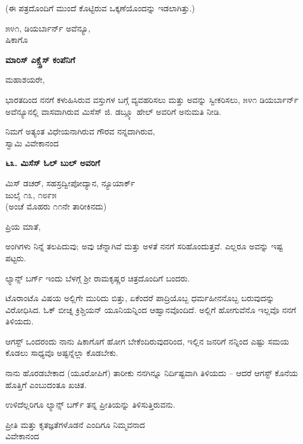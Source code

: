(ಈ ಪತ್ರದೊಂದಿಗೆ ಮುಂದೆ ಕೊಟ್ಟಿರುವ ಒಕ್ಕಣೆಯೊಂದನ್ನು ಇಡಲಾಗಿತ್ತು.)

\begin{flushright}
೫೪೧, ಡಿಯರ್ಬಾರ್ನ್ ಅವೆನ್ಯೂ,\\ಷಿಕಾಗೊ
\end{flushright}

\begin{center}
\textbf{ಮಾರಿಸ್ ಎಕ್ಸ್ಪ್ರೆಸ್ ಕಂಪೆನಿಗೆ}
\end{center}

ಮಹಾಶಯರೇ,

ಭಾರತದಿಂದ ನನಗೆ ಕಳುಹಿಸಿರುವ ವಸ್ತುಗಳ ಬಗ್ಗೆ ವ್ಯವಹರಿಸಲು ಮತ್ತು ಅವನ್ನು ಸ್ವೀಕರಿಸಲು, ೫೪೧ ಡಿಯರ್ಬಾರ್ನ್ ಅವೆನ್ಯೂನಲ್ಲಿ ವಾಸವಾಗಿರುವ ಮಿಸೆಸ್ ಜಿ. ಡಬ್ಲ್ಯೂ ಹೇಲ್ ಅವರಿಗೆ ಅನುಮತಿ ನೀಡಿ.

\begin{flushright}
ನಿಮಗೆ ಅತ್ಯಂತ ವಿಧೇಯನಾಗಿರುವ ಗೌರವ ನನ್ನದಾಗಿರುವ,\\ಸ್ವಾಮಿ ವಿವೇಕಾನಂದ
\end{flushright}

\begin{center}
\textbf{೬೩. ಮಿಸೆಸ್ ಓಲ್ ಬುಲ್ ಅವರಿಗೆ}
\end{center}

\begin{flushright}
 ಮಿಸ್ ಡಚರ್, ಸಹಸ್ರದ್ವೀಪೋದ್ಯಾನ, ನ್ಯೂಯಾರ್ಕ್\\ಜುಲೈ ೧೩, ೧೮೯೫\\(ಅಂಚೆ ಮೊಹರು ೧೧ನೇ ತಾರೀಕಿನದು)
\end{flushright}

ಪ್ರಿಯ ಮಾತೆ,

ಅಂಗಿಗಳು ನಿನ್ನೆ ತಲಪಿದುವು; ಅವು ಚೆನ್ನಾಗಿವೆ ಮತ್ತು ಅಳತೆ ನನಗೆ ಸರಿಹೊಂದುತ್ತವೆ. ಎಲ್ಲರೂ ಅವನ್ನು ಇಷ್ಟ ಪಟ್ಟರು.

ಲ್ಯಾನ್ಸ್ ಬರ್ಗ್ ಇಂದು ಬೆಳಗ್ಗೆ ಶ‍್ರೀ ರಾಮಕೃಷ್ಣರ ಚಿತ್ರದೊಂದಿಗೆ ಬಂದರು.

ಟೊರಾಂಟೊ ವಿಷಯ ಅಲ್ಲಿಗೇ ಮುರಿದು ಬಿತ್ತು, ಏಕೆಂದರೆ ಪಾದ್ರಿಯೊಬ್ಬ ಧರ್ಮಹೀನನೊಬ್ಬ ಬರುವುದನ್ನು ವಿರೋಧಿಸಿದ. ಓಕ್ ಬೀಚ್ನ ಕ್ರಿಶ್ಚಿಯನ್ ಯೂನಿಯನ್ನಿಂದ ಆಹ್ವಾನವೊಂದಿದೆ. ಅಲ್ಲಿಗೆ ಹೋಗುವೆನೊ ಇಲ್ಲವೊ ನನಗೆ ತಿಳಿಯದು.

ಆಗಸ್ಟ್ ಒಂದರಂದು ನಾನು ಷಿಕಾಗೊಗೆ ಹೋಗ ಬೇಕೆಂದಿರುವುದರಿಂದ, ಇಲ್ಲಿನ ಜನರಿಗೆ ನನ್ನಿಂದ ಎಷ್ಟು ಸಮಯ ಕೊಡಲು ಸಾಧ್ಯವೊ ಅಷ್ಟನ್ನೆಲ್ಲಾ ಕೊಡಬೇಕು.

ನಾನು ಹೊರಡಬೇಕಾದ (ಯೂರೋಪಿಗೆ) ತಾರೀಕು ನನಗಿನ್ನೂ ನಿರ್ದಿಷ್ಟವಾಗಿ ತಿಳಿಯದು – ಆದರೆ ಆಗಸ್ಟ್ ಕೊನೆಯ ಹೊತ್ತಿಗೆ ಎಂಬುದಂತೂ ಖಚಿತ.

ಉಳಿದೆಲ್ಲರಿಗೂ ಲ್ಯಾನ್ಸ್ ಬರ್ಗ್ ತನ್ನ ಪ್ರೀತಿಯನ್ನು ತಿಳಿಸುತ್ತಿರುವನು.

\begin{flushright}
ಪ್ರೀತಿ ಮತ್ತು ಕೃತಜ್ಞತೆಗಳೊಡನೆ ಎಂದಿಗೂ ನಿಮ್ಮವನಾದ\\ವಿವೇಕಾನಂದ
\end{flushright}

